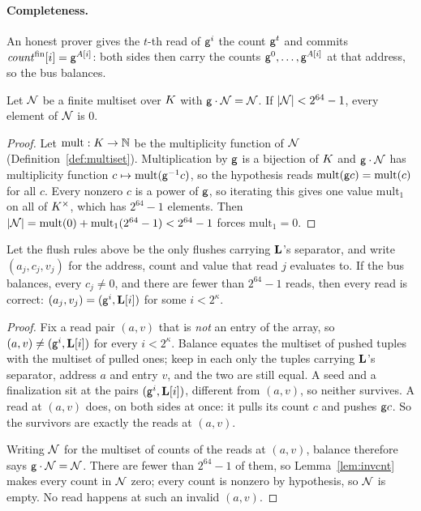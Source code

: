 \paragraph{Completeness.} An honest prover gives the $t$-th read of $\mathsf{g}^{i}$ the count $\mathsf{g}^{t}$ and commits $\mathit{count}^{\mathrm{fin}}[i]=\mathsf{g}^{A[i]}$: both sides then carry the counts $\mathsf{g}^{0},\dots,\mathsf{g}^{A[i]}$ at that address, so the bus balances.

\begin{lemma}\label{lem:invcnt}
Let $\mathcal{N}$ be a finite multiset over $K$ with $\mathsf{g}\cdot\mathcal{N}=\mathcal{N}$. If $|\mathcal{N}|<2^{64}-1$, every element of $\mathcal{N}$ is $0$.
\end{lemma}

\begin{proof}
Let $\mathrm{mult}:K\to\mathbb{N}$ be the multiplicity function of $\mathcal{N}$ (Definition~\ref{def:multiset}). Multiplication by $\mathsf{g}$ is a bijection of $K$ and $\mathsf{g}\cdot\mathcal{N}$ has multiplicity function $c\mapsto\mathrm{mult}(\mathsf{g}^{-1}c)$, so the hypothesis reads $\mathrm{mult}(\mathsf{g} c)=\mathrm{mult}(c)$ for all $c$. Every nonzero $c$ is a power of $\mathsf{g}$, so iterating this gives one value $\mathrm{mult}_1$ on all of $K^{\times}$, which has $2^{64}-1$ elements. Then $|\mathcal{N}|=\mathrm{mult}(0)+\mathrm{mult}_1(2^{64}-1)<2^{64}-1$ forces $\mathrm{mult}_1=0$.
\end{proof}

\begin{theorem}\label{thm:omc}
Let the flush rules above be the only flushes carrying $\mathbf{L}$'s separator, and write $(a_j,c_j,v_j)$ for the address, count and value that read $j$ evaluates to. If the bus balances, every $c_j\neq0$, and there are fewer than $2^{64}-1$ reads, then every read is correct: $(a_j,v_j)=(\mathsf{g}^{i},\mathbf{L}[i])$ for some $i<2^{\kappa}$.
\end{theorem}

\begin{proof}
Fix a read pair $(a,v)$ that is \emph{not} an entry of the array, so $(a,v)\neq(\mathsf{g}^{i},\mathbf{L}[i])$ for every $i<2^{\kappa}$. Balance equates the multiset of pushed tuples with the multiset of pulled ones; keep in each only the tuples carrying $\mathbf{L}$'s separator, address $a$ and entry $v$, and the two are still equal. A seed and a finalization sit at the pairs $(\mathsf{g}^{i},\mathbf{L}[i])$, different from $(a,v)$, so neither survives. A read at $(a,v)$ does, on both sides at once: it pulls its count $c$ and pushes $\mathsf{g} c$. So the survivors are exactly the reads at $(a,v)$.

Writing $\mathcal{N}$ for the multiset of counts of the reads at $(a,v)$, balance therefore says $\mathsf{g}\cdot\mathcal{N}=\mathcal{N}$. There are fewer than $2^{64}-1$ of them, so Lemma~\ref{lem:invcnt} makes every count in $\mathcal{N}$ zero; every count is nonzero by hypothesis, so $\mathcal{N}$ is empty. No read happens at such an invalid $(a,v)$.

\end{proof}

